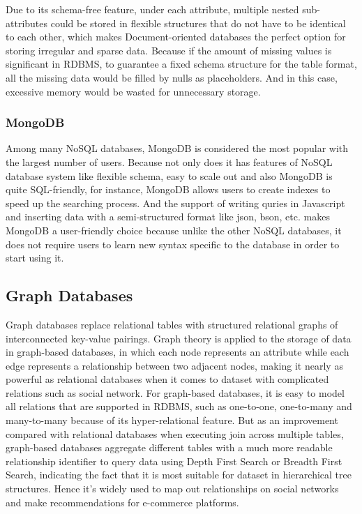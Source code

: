  Due to its schema-free feature, under each attribute, multiple nested sub-attributes could be stored in flexible structures that do not have to be identical to each other, which makes Document-oriented databases the perfect option for storing irregular and  sparse data. Because if the amount of missing values is significant in RDBMS, to guarantee a fixed schema structure for the table format, all the missing data would be filled by nulls as placeholders. And in this case, excessive memory would be wasted for unnecessary storage.  


\subsubsection{MongoDB}\mbox{}

Among many NoSQL databases, MongoDB is considered the most popular with the largest number of users. Because not only does it has features of NoSQL database system like flexible schema, easy to scale out and also MongoDB is quite SQL-friendly, for instance, MongoDB allows users to create indexes to speed up the searching process. And the support of writing quries in Javascript and inserting data with a semi-structured format like json, bson, etc. makes MongoDB a user-friendly choice because unlike the other NoSQL databases, it does not require users to learn new syntax specific to the database in order to start using it.


\subsection{Graph Databases}\mbox{}

Graph databases replace relational tables with structured relational graphs of
interconnected key-value pairings\cite{DBLP:journals/corr/MoniruzzamanH13}. Graph theory is applied to the storage of data in graph-based databases, in which each node represents an attribute while each edge represents a relationship between two adjacent nodes, making it nearly as powerful as relational databases when it comes to dataset with complicated relations such as social network. For graph-based databases, it is easy to model all relations that are supported in RDBMS, such as one-to-one, one-to-many and many-to-many because of its hyper-relational feature. But as an improvement compared with relational databases when executing join across multiple tables, graph-based databases aggregate different tables with a much more readable relationship identifier to query data using Depth First Search or Breadth First Search, indicating the fact that it is most suitable for dataset in hierarchical tree structures. Hence it's widely used to map out relationships on social networks and make recommendations for e-commerce platforms.


